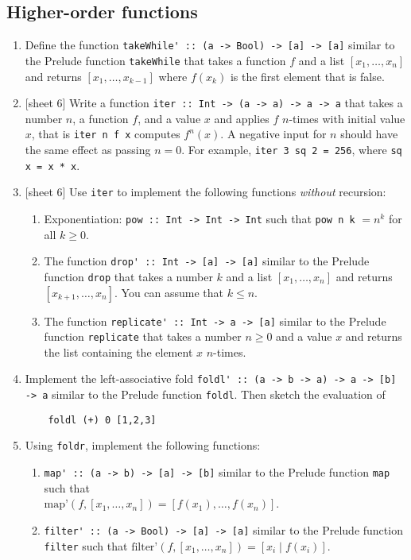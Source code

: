 \documentclass{article}
\begin{document}
\subsection{Higher-order functions}
\begin{enumerate}
\item Define the function \verb|takeWhile' :: (a -> Bool) -> [a] -> [a]| similar to the Prelude function \verb|takeWhile| that takes a function $f$ and a list $[x_1, \dots, x_n]$ and returns $[x_1, \dots, x_{k-1}]$ where $f(x_k)$ is the first element that is false.

\item {[sheet 6]} Write a function \verb|iter :: Int -> (a -> a) -> a -> a| that takes a number $n$, a function $f$, and a value $x$ and applies $f$ $n$-times with initial value $x$, that is \verb|iter n f x| computes $f^n(x)$. A negative input for $n$ should have the same effect as passing $n = 0$. For example, \verb|iter 3 sq 2 = 256|, where \verb|sq x = x * x|.

\item {[sheet 6]} Use \verb|iter| to implement the following functions \textit{without} recursion:
\begin{enumerate}
\item Exponentiation: \verb|pow :: Int -> Int -> Int| such that \verb|pow n k| $= n^k$ for all $k \geq 0$.
\item The function \verb|drop' :: Int -> [a] -> [a]| similar to the Prelude function \verb|drop| that takes a number $k$ and a list $[x_1, \dots, x_n]$ and returns $[x_{k+1}, \dots, x_n]$. You can assume that $k \leq n$.
\item The function \verb|replicate' :: Int -> a -> [a]| similar to the Prelude function \verb|replicate| that takes a number $n \geq 0$ and a value $x$ and returns the list containing the element $x$ $n$-times.
\end{enumerate}

\item Implement the left-associative fold \verb|foldl' :: (a -> b -> a) -> a -> [b] -> a| similar to the Prelude function \verb|foldl|. Then sketch the evaluation of
\begin{verbatim}
    foldl (+) 0 [1,2,3]
\end{verbatim}

\item Using \verb|foldr|, implement the following functions:
\begin{enumerate}
\item \verb|map' :: (a -> b) -> [a] -> [b]| similar to the Prelude function \verb|map| such that \\ $\text{map'}(f, [x_1, \dots, x_n]) = [f(x_1), \dots, f(x_n)]$.
\item \verb|filter' :: (a -> Bool) -> [a] -> [a]| similar to the Prelude function \verb|filter| such that $\text{filter'}(f, [x_1, \dots, x_n]) = [x_i \mid f(x_i)]$.
\end{enumerate}


\end{enumerate}
\end{document}
